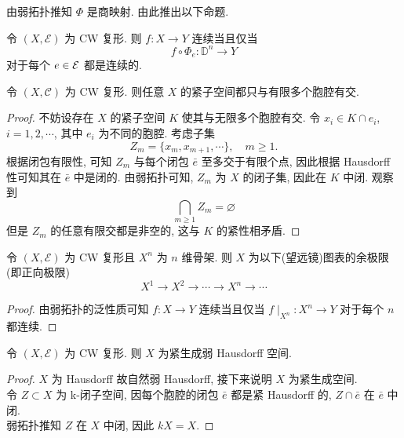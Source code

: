 由弱拓扑推知 $\Phi$ 是商映射. 由此推出以下命题.
\begin{proposition}
    令 $(X,\mathcal{E})$ 为 CW 复形. 则 $f\colon X \to Y$ 连续当且仅当
    \[
        f\circ \Phi_e \colon \mathbb{D}^n \to Y
    \]
    对于每个 $e\in \cal{E}$ 都是连续的.
\end{proposition}
\begin{proposition}
    令 $(X,\mathcal{C})$ 为 CW 复形. 则任意 $X$ 的紧子空间都只与有限多个胞腔有交.
\end{proposition}
\begin{proof}
    不妨设存在 $X$ 的紧子空间 $K$ 使其与无限多个胞腔有交. 令 $x_i \in K\cap e_i$, $i=1,2,\cdots$, 
    其中 $e_i$ 为不同的胞腔. 考虑子集
    \[
        Z_m = \{x_m,x_{m+1},\cdots\}, \quad m\geq 1.
    \]
    根据闭包有限性, 可知 $Z_m$ 与每个闭包 $\bar{e}$ 至多交于有限个点, 因此根据 Hausdorff 性可知其在 $\bar{e}$ 中是闭的.
    由弱拓扑可知, $Z_m$ 为 $X$ 的闭子集, 因此在 $K$ 中闭. 观察到
    \[
        \bigcap_{m \geq 1} Z_m = \varnothing
    \]
    但是 $Z_m$ 的任意有限交都是非空的, 这与 $K$ 的紧性相矛盾.
\end{proof}
\begin{proposition}
    令 $(X,\mathcal{E})$ 为 CW 复形且 $X^n$ 为 $n$ 维骨架. 则 $X$ 为以下(望远镜)图表的余极限(即正向极限)
    \[
        X^1 \to X^2 \to \cdots \to X^n \to \cdots
    \]
\end{proposition}
\begin{proof}
    由弱拓扑的泛性质可知 $f\colon X \to Y$ 连续当且仅当 $f\mid_{X^n} \colon X^n \to Y$ 对于每个 $n$ 都连续.
\end{proof}
\begin{proposition}
    令 $(X,\mathcal{E})$ 为 CW 复形. 则 $X$ 为紧生成弱 Hausdorff 空间.
\end{proposition}
\begin{proof}
    $X$ 为 Hausdorff 故自然弱 Hausdorff, 接下来说明 $X$ 为紧生成空间.\\
    令 $Z \subset X$ 为 k-闭子空间, 因每个胞腔的闭包 $\bar{e}$ 都是紧 Hausdorff 的, $Z\cap \bar{e}$ 在 $\bar{e}$ 中闭.\\
    弱拓扑推知 $Z$ 在 $X$ 中闭, 因此 $kX = X$.
\end{proof}
